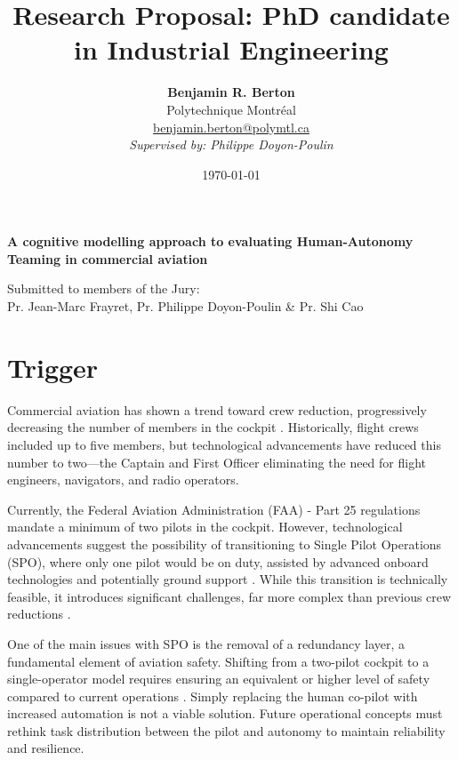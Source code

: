 \documentclass[12pt,a4paper]{article} %
\title{\textbf{Research Proposal: PhD candidate in Industrial Engineering}} %
\author{
	\textbf{Benjamin R. Berton}\\
	Polytechnique Montréal\\
	\href{mailto:benjamin.berton@polymtl.ca}{benjamin.berton@polymtl.ca}\\
	\textit{Supervised by: Philippe Doyon-Poulin}
} %
\begin{document}
	\maketitle %
	
	\begin{center}
		\textbf{A cognitive modelling approach to evaluating Human-Autonomy Teaming in commercial aviation}
	\end{center} %
	
	\begin{center}
		Submitted to members of the Jury:\\
		Pr. Jean-Marc Frayret, Pr. Philippe Doyon-Poulin \& Pr. Shi Cao\\
		\date{\today} %
	\end{center} %
	
	\newpage %
	
	\tableofcontents %
	\newpage %
	
	\section{Trigger} %
	Commercial aviation has shown a trend toward crew reduction, progressively decreasing the number of members in the cockpit \parencite{harris_human-centred_2007}. Historically, flight crews included up to five members, but technological advancements have reduced this number to two—the Captain and First Officer eliminating the need for flight engineers, navigators, and radio operators.
	
	Currently, the Federal Aviation Administration (FAA) - Part 25 regulations mandate a minimum of two pilots in the cockpit. However, technological advancements suggest the possibility of transitioning to Single Pilot Operations (SPO), where only one pilot would be on duty, assisted by advanced onboard technologies and potentially ground support \parencite{bilimoria_conceptual_2014}. While this transition is technically feasible, it introduces significant challenges, far more complex than previous crew reductions \parencite{matessa_using_2017}.
	
	One of the main issues with SPO is the removal of a redundancy layer, a fundamental element of aviation safety. Shifting from a two-pilot cockpit to a single-operator model requires ensuring an equivalent or higher level of safety compared to current operations \parencite{boy_requirements_2014}. Simply replacing the human co-pilot with increased automation is not a viable solution. Future operational concepts must rethink task distribution between the pilot and autonomy to maintain reliability and resilience.
	
\end{document}
